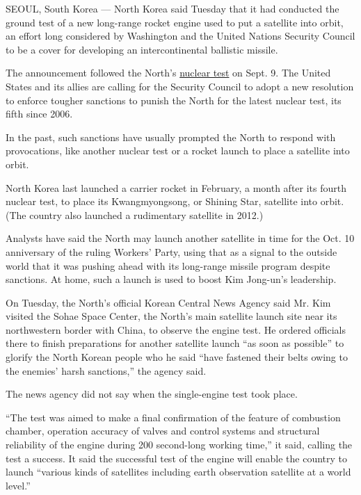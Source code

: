 SEOUL, South Korea --- North Korea said Tuesday that it had conducted
the ground test of a new long-range rocket engine used to put a
satellite into orbit, an effort long considered by Washington and the
United Nations Security Council to be a cover for developing an
intercontinental ballistic missile.

The announcement followed the North's
\href{http://www.nytimes.com/2016/09/09/world/asia/north-korea-nuclear-test.html}{nuclear
test} on Sept. 9. The United States and its allies are calling for the
Security Council to adopt a new resolution to enforce tougher sanctions
to punish the North for the latest nuclear test, its fifth since 2006.

In the past, such sanctions have usually prompted the North to respond
with provocations, like another nuclear test or a rocket launch to place
a satellite into orbit.

North Korea last launched a carrier rocket in February, a month after
its fourth nuclear test, to place its Kwangmyongsong, or Shining Star,
satellite into orbit. (The country also launched a rudimentary satellite
in 2012.)

Analysts have said the North may launch another satellite in time for
the Oct. 10 anniversary of the ruling Workers' Party, using that as a
signal to the outside world that it was pushing ahead with its
long-range missile program despite sanctions. At home, such a launch is
used to boost Kim Jong-un's leadership.

On Tuesday, the North's official Korean Central News Agency said Mr. Kim
visited the Sohae Space Center, the North's main satellite launch site
near its northwestern border with China, to observe the engine test. He
ordered officials there to finish preparations for another satellite
launch ``as soon as possible'' to glorify the North Korean people who he
said ``have fastened their belts owing to the enemies' harsh
sanctions,'' the agency said.

The news agency did not say when the single-engine test took place.

``The test was aimed to make a final confirmation of the feature of
combustion chamber, operation accuracy of valves and control systems and
structural reliability of the engine during 200 second-long working
time,'' it said, calling the test a success. It said the successful test
of the engine will enable the country to launch ``various kinds of
satellites including earth observation satellite at a world level.''

